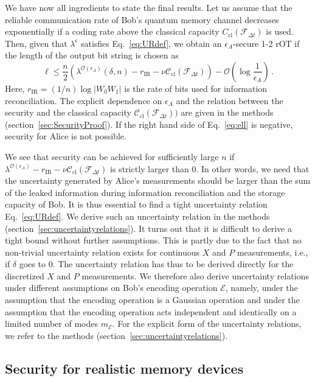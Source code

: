 \documentclass[aps,amsfonts,twoside,amssymb,superscriptaddress,twocolumn]{revtex4-1}
\newcommand*{\cC}{\mathcal{C}}
\newcommand*{\cE}{\mathcal{E}}
\newcommand*{\cF}{\mathcal{F}}
\newcommand*{\cO}{\mathcal{O}}
\newcommand*{\cl}{\textrm{cl}}
\newcommand*{\ec}{\textrm{IR}}
\begin{document}
We have now all ingredients to state the final results. Let us assume that the reliable communication rate of Bob's quantum memory channel decreases exponentially if a coding rate above the classical capacity $C_\cl(\cF_{\Delta t})$ is used. Then, given that $\lambda^\epsilon$ satisfies Eq.~\eqref{eq:URdef}, we obtain an $\epsilon_A$-secure 1-2 rOT if the length of the output bit string is chosen as
\begin{equation} \label{eq:ell}
\ell \le \frac{n}{2} (\lambda^{\cO(\epsilon_A)}(\delta,n) - r_\ec-  \nu \cC_\cl(\cF_{\Delta t})) - \cO(\log\frac{1}{\epsilon_A})\,.
\end{equation} 
Here, $r_{\ec} = (1/n)\log|W_0 W_1|$ is the rate of bits used for information reconciliation. The explicit dependence on $\epsilon_A$ and the relation between the security and the classical capacity $\cC_\cl(\cF_{\Delta t}))$ are given in the methods (section~\ref{sec:SecurityProof}). If the right hand side of Eq.~\eqref{eq:ell} is negative, security for Alice is not possible.

We see that security can be achieved for sufficiently large $n$ if $\lambda^{\cO(\epsilon_A)} - r_\ec-  \nu \cC_\cl(\cF_{\Delta t})$ is strictly larger than 0. In other words, we need that the uncertainty generated by Alice's measurements should be larger than the sum of the leaked information during information reconciliation and the storage capacity of Bob. It is thus essential to find a tight uncertainty relation Eq.~\eqref{eq:URdef}. We derive such an uncertainty relation in the methods (section~\ref{sec:uncertaintyrelations}). It turns out that it is difficult to derive a tight bound without further assumptions. This is partly due to the fact that no non-trivial uncertainty relation exists for continuous $X$ and $P$ measurements, i.e., if $\delta$ goes to $0$. The uncertainty relation has thus to be derived directly for the discretized $X$ and $P$ measurements. We therefore also derive uncertainty relations under different assumptions on Bob's encoding operation $\cE$, namely, under the assumption that the encoding operation is a Gaussian operation and under the assumption that the encoding operation acts independent and identically on a limited number of modes $m_{\cE}$. For the explicit form of the uncertainty relations, we refer to the methods (section~\ref{sec:uncertaintyrelations}). 


\subsection{Security for realistic memory devices} 
\end{document}
